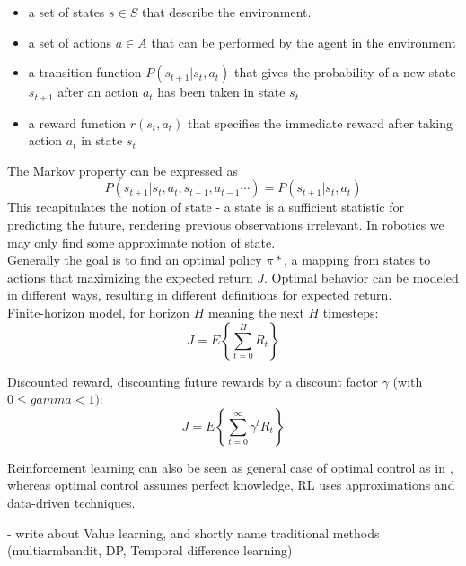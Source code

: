 \begin{itemize}
\item a set of states $s \in S$ that describe the environment.
\item a set of actions $a \in A$ that can be performed by the agent in the environment
\item a transition function $P(s_{t+1} | s_t, a_t)$ that gives the probability of a new
  state $s_{t+1}$ after an action $a_t$ has been taken in state $s_t$
\item a reward function $r(s_t, a_t)$ that specifies the immediate reward after taking action
  $a_t$ in state $s_t$
\end{itemize}

The Markov property can be expressed as
$$ P(s_{t+1} | s_t, a_t, s_{t-1}, a_{t-1}\cdots) = P(s_{t+1} | s_t, a_t)$$
This recapitulates the notion of state - a state is a sufficient statistic
for predicting the future, rendering previous observations irrelevant.
In robotics we may only find some approximate notion of state. \\
Generally the goal is to find an optimal policy $\pi*$,
a mapping from states to actions that
maximizing the expected return $J$.
Optimal behavior can be modeled in
different ways, resulting in different
definitions for expected return. \\
Finite-horizon model, for horizon $H$ meaning the next $H$ timesteps:
$$ J = E \left\{\sum^H_{t=0} R_t \right\} $$

Discounted reward, discounting future rewards by a discount factor $\gamma$
(with $0 \leq gamma < 1)$:
$$ J = E \left\{\sum^{\infty}_{t=0} \gamma^t R_t \right\} $$

Reinforcement learning can also be seen as
general case of optimal control as in \citet{sutton1992reinforcement},
whereas optimal control assumes perfect knowledge, RL uses approximations
and data-driven techniques.

- write about Value learning, and shortly name traditional methods (multiarmbandit,
DP, Temporal difference learning)


